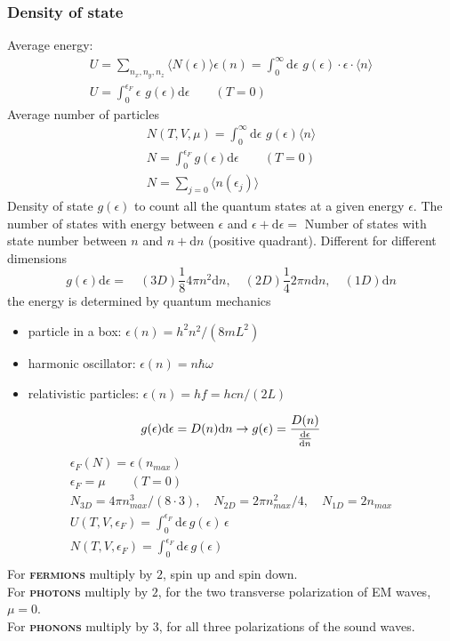 \documentclass[a4paper, norsk, 8pt]{article}
\begin{document}
\begin{multicols*}{3}
\subsubsection*{\scriptsize  Density of state}
Average energy:
\begin{gather*}
  U = \sum_{n_x,n_y,n_z} \langle N(\epsilon) \rangle \epsilon(n) = \int_{0}^{\infty}\mbox{d}\epsilon\,\, g(\epsilon)\cdot \epsilon \cdot \langle n \rangle \\
  U = \int_0^{\epsilon_F} \epsilon \,\,g(\epsilon) \mbox{d}\epsilon \qquad (T=0)
\end{gather*}
Average number of particles
\begin{gather*}
  N(T,V,\mu) = \int_0^{\infty} \mbox{d}\epsilon\,\, g(\epsilon) \langle n \rangle \\
  N = \int_0^{\epsilon_F} g(\epsilon) \mbox{d}\epsilon \qquad (T=0)\\
  N = \sum_{j=0} \langle n(\epsilon_j) \rangle
\end{gather*}
Density of state $g(\epsilon)$ to count all the quantum states at a given energy $\epsilon$. The number of states with energy between $\epsilon$ and $\epsilon + \mbox{d}\epsilon = $ Number of states with state number between $n$ and $n+\mbox{d}n$ (positive quadrant). Different for different dimensions
\begin{equation*}
  \boxed{g(\epsilon) \mbox{d}\epsilon=} \quad(3D) \frac{1}{8}4\pi n^2 \mbox{d}n, \quad(2D) \frac{1}{4}2\pi n \mbox{d}n, \quad(1D)\mbox{d}n
\end{equation*}
the energy is determined by quantum mechanics
\begin{itemize}
  \item particle in a box: $\epsilon(n) = h^2n^2/(8mL^2)$
  \item harmonic oscillator: $\epsilon(n) = n\hbar\omega$
  \item relativistic particles: $\epsilon(n) = hf = hcn/(2L)$
\end{itemize}
\begin{equation*}
    g(\epsilon)\mbox{d}\epsilon = D(n)\mbox{d}n \rightarrow g(\epsilon) = \frac{D(n)}{\dv{\epsilon}{n}}
\end{equation*}
\begin{gather*}
  \epsilon_F(N) = \epsilon(n_{max}) \\
  \epsilon_F = \mu \qquad (T=0) \\
  N_{3D} = 4\pi n_{max}^3/(8\cdot 3), \quad N_{2D} = 2\pi n_{max}^2/4, \quad N_{1D} = 2n_{max}\\
  U(T,V,\epsilon_F) = \int_0^{\epsilon_F} \mbox{d}\epsilon \, g(\epsilon)\, \epsilon \\
  N(T,V,\epsilon_F) = \int_0^{\epsilon_F} \mbox{d}\epsilon \, g(\epsilon) \\
\end{gather*}
For \textbf{\textsc{fermions}} multiply by $2$, spin up and spin down.\\
For \textbf{\textsc{photons}} multiply by $2$, for the two transverse polarization of EM waves, $\mu=0$.\\
For \textbf{\textsc{phonons}} multiply by $3$, for all three polarizations of the sound waves.


\end{multicols*}
\end{document}
